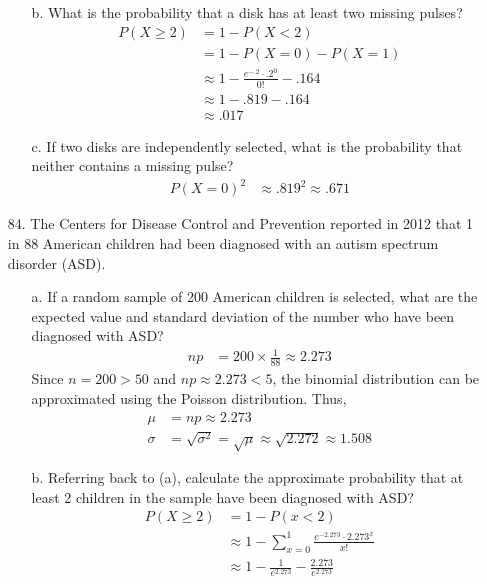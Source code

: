 \documentclass[letterpaper,12pt]{article}
\newcommand{\poisson}[2]{%
  \frac{e^{-#2} \cdot #2^{#1}}{#1!}%
}
\newcommand{\poissonsum}[3]{%
  \sum_{x = #1}^{#2} \poisson{x}{#3}%
}
\begin{document}
\begin{enumerate}
\begin{enumerate}
      \item[b.]
        What is the probability that a disk has at least two missing pulses?
        \begin{align*}
          P(X \ge 2) &= 1 - P(X < 2) \\
          &= 1 - P(X = 0) - P(X = 1) \\
          &\approx 1 - \poisson{0}{.2} - .164 \\
          &\approx 1 - .819 - .164 \\
          &\approx .017
        \end{align*}
      \item[c.]
        If two disks are independently selected, what is the probability that neither contains a missing pulse?
        \begin{align*}
          P(X = 0)^2 &\approx .819^2 \approx .671
        \end{align*}
    \end{enumerate}
  \item[84.]
    The Centers for Disease Control and Prevention reported in 2012 that 1 in 88 American children had been diagnosed with an autism spectrum disorder (ASD).
    \begin{enumerate}
      \item[a.]
        If a random sample of 200 American children is selected, what are the expected value and standard deviation of the number who have been diagnosed with ASD?
        \begin{align*}
          np &= 200 \times \frac{1}{88} \approx 2.273
        \end{align*}
        Since $n = 200 > 50$ and $np \approx 2.273 < 5$, the binomial distribution can be approximated using the Poisson distribution. Thus,
        \begin{align*}
          \mu &= np \approx 2.273 \\
          \sigma &= \sqrt{\sigma^2} = \sqrt{\mu} \approx \sqrt{2.272} \approx 1.508
        \end{align*}
      \item[b.]
        Referring back to (a), calculate the approximate probability that at least 2 children in the sample have been diagnosed with ASD?
        \begin{align*}
          P(X \ge 2) &= 1 - P(x < 2) \\
          &\approx 1 - \poissonsum{0}{1}{2.273} \\
          &\approx 1 - \frac{1}{e^{2.273}} - \frac{2.273}{e^{2.273}} \\

\end{align*}
\end{enumerate}
\end{enumerate}
\end{document}
